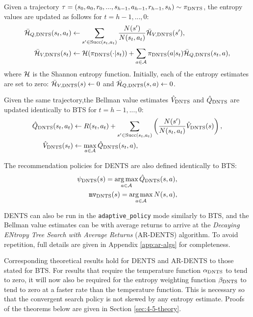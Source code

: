         Given a trajectory $\tau=(s_0,a_0,r_0,...,s_{h-1},a_{h-1},r_{h-1},s_h)\sim{\pi_{{\textnormal{DNTS}}}}$, the entropy values are updated as follows for $t=h-1,...,0$:
        \begin{align}
            {\bar{\mathcal{H}}_{Q,{\textnormal{DNTS}}}}(s_t,a_t) &\leftarrow \sum_{s'\in {\textnormal{Succ}(s_t,a_t)}} \frac{N(s')}{N(s_t,a_t)} {\bar{\mathcal{H}}_{V,{\textnormal{DNTS}}}}(s'), 
                \label{eq::4dents_entropy_q_backup} \\
            {\bar{\mathcal{H}}_{V,{\textnormal{DNTS}}}}(s_t) &\leftarrow \mathcal{H}({\pi_{{\textnormal{DNTS}}}}(\cdot | s_t)) + \sum_{a\in\mathcal{A}} {\pi_{{\textnormal{DNTS}}}}(a|s_t){\bar{\mathcal{H}}_{Q,{\textnormal{DNTS}}}}(s_t,a), 
                \label{eq:4:dents_entropy_v_backup} 
        \end{align}
        where $\mathcal{H}$ is the Shannon entropy function. Initially, each of the entropy estimates are set to zero:  ${\bar{\mathcal{H}}_{V,{\textnormal{DNTS}}}}(s) \leftarrow 0$ and ${\bar{\mathcal{H}}_{Q,{\textnormal{DNTS}}}}(s,a) \leftarrow 0$.

        Given the same trajectory,the Bellman value estimates ${\hat{V}_{{\textnormal{DNTS}}}}$ and ${\hat{Q}_{{\textnormal{DNTS}}}}$ are updated identically to BTS for $t=h-1,...,0$:
        \begin{align}
            {\hat{Q}_{{\textnormal{DNTS}}}}(s_t,a_t) &\leftarrow 
                R(s_t,a_t) + \sum_{s' \in {\textnormal{Succ}(s_t,a_t)}} \left( \frac{N(s')}{N(s_t,a_t)} {\hat{V}_{{\textnormal{DNTS}}}}(s) \right), 
                        \label{eq:dents_q_backup} \\ 
            {\hat{V}_{{\textnormal{DNTS}}}}(s_t) &\leftarrow \max_{a\in\mathcal{A}} {\hat{Q}_{{\textnormal{DNTS}}}}(s_t,a), 
                        \label{eq:dents_v_backup} 
        \end{align}

        The recommendation policies for DENTS are also defined identically to BTS:
        \begin{align}
            {\psi_{{\textnormal{DNTS}}}}(s)=\operatorname*{arg\,max}_{a\in\mathcal{A}}{\hat{Q}_{{\textnormal{DNTS}}}}(s,a), \label{eq:4:psidents} \\
            {\textup{\texttt{mv}}_{{\textnormal{DNTS}}}}(s) = \operatorname*{arg\,max}_{a\in\mathcal{A}} N(s,a), \label{eq:4:mvdents}
        \end{align}
        
        DENTS can also be run in the \texttt{adaptive\_policy} mode similarly to BTS, and the Bellman value estimates can be with average returns to arrive at the \textit{Decaying ENtropy Tree Search with Average Returns} (AR-DENTS) algorithm. To avoid repetition, full details are given in Appendix \ref{app:ar-algs} for completeness.

        Corresponding theoretical results hold for DENTS and AR-DENTS to those stated for BTS. For results that require the temperature function ${\alpha_{{\textnormal{DNTS}}}}$ to tend to zero, it will now also be required for the entropy weighting function ${\beta_{{\textnormal{DNTS}}}}$ to tend to zero at a faster rate than the temperature function. This is necessary so that the convergent search policy is not skewed by any entropy estimate. Proofs of the theorems below are given in Section \ref{sec:4-5-theory}.

